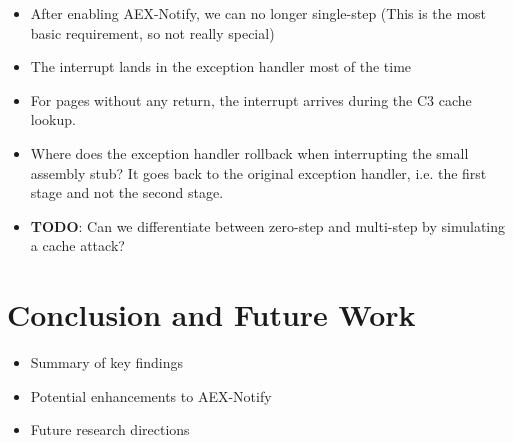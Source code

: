 \documentclass{llncs}
\begin{document}
\begin{itemize}
  \item After enabling AEX-Notify, we can no longer single-step (This is the most basic requirement, so not really special)
  \item The interrupt lands in the exception handler most of the time
  \item For pages without any return, the interrupt arrives during the C3 cache lookup.
  \item Where does the exception handler rollback when interrupting the small assembly stub?
    It goes back to the original exception handler, i.e. the first stage and not the second stage.
  \item \textbf{TODO}: Can we differentiate between zero-step and multi-step by simulating a cache attack?
\end{itemize}

\section{Conclusion and Future Work}
\begin{itemize}
    \item Summary of key findings
    \item Potential enhancements to AEX-Notify
    \item Future research directions
\end{itemize}


%

\end{document}
